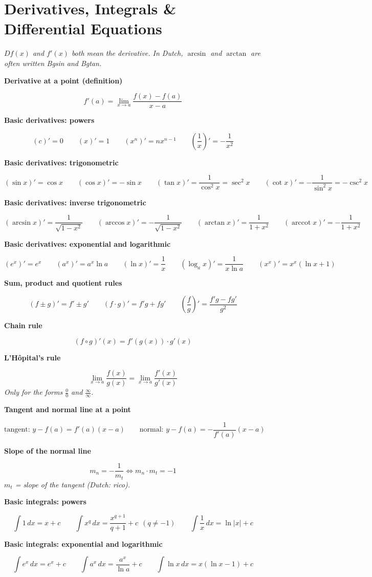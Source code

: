 \documentclass[11pt]{article}
\newcommand{\sect}[2]{\section*{\color{#1}#2}}
\newcommand{\sub}[1]{\par\medskip\textbf{#1}\par}
\newcommand{\expl}[1]{{\color{gray}\itshape #1}\par}
\begin{document}
\sect{cDer}{Derivatives, Integrals \& Differential Equations}
\expl{$Df(x)$ and $f'(x)$ both mean the derivative. In Dutch, $\arcsin$ and $\arctan$ are often written Bgsin and Bgtan.}

\sub{Derivative at a point (definition)}
\[ f'(a) = \lim_{x\to a} \frac{f(x) - f(a)}{x - a} \]

\sub{Basic derivatives: powers}
\[ (c)' = 0 \qquad (x)' = 1 \qquad (x^n)' = n x^{n-1} \qquad \left(\frac{1}{x}\right)' = -\frac{1}{x^2} \]

\sub{Basic derivatives: trigonometric}
\[ (\sin x)' = \cos x \qquad (\cos x)' = -\sin x \qquad (\tan x)' = \frac{1}{\cos^2 x} = \sec^2 x \qquad (\cot x)' = -\frac{1}{\sin^2 x} = -\csc^2 x \]

\sub{Basic derivatives: inverse trigonometric}
\[ (\arcsin x)' = \frac{1}{\sqrt{1 - x^2}} \qquad (\arccos x)' = -\frac{1}{\sqrt{1 - x^2}} \qquad (\arctan x)' = \frac{1}{1 + x^2} \qquad (\operatorname{arccot} x)' = -\frac{1}{1 + x^2} \]

\sub{Basic derivatives: exponential and logarithmic}
\[ (e^x)' = e^x \qquad (a^x)' = a^x \ln a \qquad (\ln x)' = \frac{1}{x} \qquad (\log_a x)' = \frac{1}{x\ln a} \qquad (x^x)' = x^x(\ln x + 1) \]

\sub{Sum, product and quotient rules}
\[ (f \pm g)' = f' \pm g' \qquad (f\cdot g)' = f'g + fg' \qquad \left(\frac{f}{g}\right)' = \frac{f'g - fg'}{g^2} \]

\sub{Chain rule}
\[ \left(f \circ g\right)'(x) = f'\!\left(g(x)\right)\cdot g'(x) \]

\sub{L'Hôpital's rule}
\[ \lim_{x\to a} \frac{f(x)}{g(x)} = \lim_{x\to a} \frac{f'(x)}{g'(x)} \]
\expl{Only for the forms $\frac{0}{0}$ and $\frac{\infty}{\infty}$.}

\sub{Tangent and normal line at a point}
\[ \text{tangent: } y - f(a) = f'(a)(x - a) \qquad \text{normal: } y - f(a) = -\frac{1}{f'(a)}(x - a) \]

\sub{Slope of the normal line}
\[ m_n = -\frac{1}{m_t} \iff m_n\cdot m_t = -1 \]
\expl{$m_t$ = slope of the tangent (Dutch: rico).}

\sub{Basic integrals: powers}
\[ \int 1\,dx = x + c \qquad \int x^q\,dx = \frac{x^{q+1}}{q+1} + c\ \ (q \ne -1) \qquad \int \frac{1}{x}\,dx = \ln|x| + c \]

\sub{Basic integrals: exponential and logarithmic}
\[ \int e^x\,dx = e^x + c \qquad \int a^x\,dx = \frac{a^x}{\ln a} + c \qquad \int \ln x\,dx = x(\ln x - 1) + c \]
\end{document}
